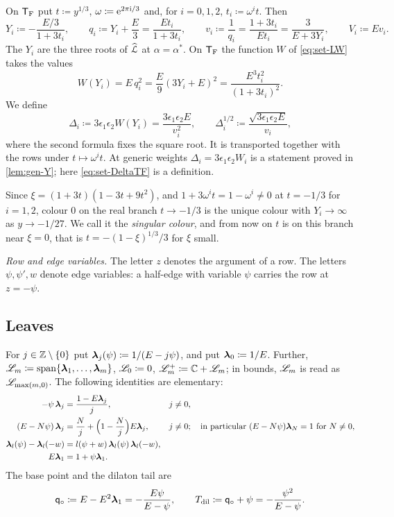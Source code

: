 On $\mathsf{T}_{\mathrm{F}}$ put $t\coloneqq y^{1/3}$, $\omega\coloneqq\mathrm{e}^{2\pi\mathrm{i}/3}$ and, for $i=0,1,2$, $t_i\coloneqq\omega^it$. Then
\begin{equation}
\label{eq:set-colours}
Y_i\coloneqq-\frac{E/3}{1+3t_i},\qquad
q_i\coloneqq Y_i+\frac E3=\frac{Et_i}{1+3t_i},\qquad
v_i\coloneqq\frac{1}{q_i}=\frac{1+3t_i}{Et_i}=\frac{3}{E+3Y_i},\qquad
V_i\coloneqq Ev_i .
\end{equation}
The $Y_i$ are the three roots of $\widehat{\mathcal{L}}$ at $\alpha=\alpha^*$. On $\mathsf{T}_{\mathrm{F}}$ the function $W$ of \eqref{eq:set-LW} takes the values
\begin{equation}
\label{eq:set-WTF}
W(Y_i)=E\,q_i^2=\frac E9(3Y_i+E)^2=\frac{E^3t_i^2}{(1+3t_i)^2}.
\end{equation}
We define
\begin{equation}
\label{eq:set-DeltaTF}
\Delta_i\coloneqq3\epsilon_1\epsilon_2W(Y_i)=\frac{3\epsilon_1\epsilon_2E}{v_i^2},\qquad
\Delta_i^{1/2}\coloneqq\frac{\sqrt{3\epsilon_1\epsilon_2E}}{v_i},
\end{equation}
where the second formula fixes the square root. It is transported together with the rows under $t\mapsto\omega^it$. At generic weights $\Delta_i=3\epsilon_1\epsilon_2W_i$ is a statement proved in \cref{lem:gen-Y}; here \eqref{eq:set-DeltaTF} is a definition.

Since $\xi=(1+3t)(1-3t+9t^2)$, and $1+3\omega^it=1-\omega^i\neq0$ at $t=-1/3$ for $i=1,2$, colour $0$ on the real branch $t\to-1/3$ is the unique colour with $Y_i\to\infty$ as $y\to-1/27$. We call it the \emph{singular colour}, and from now on $t$ is on this branch near $\xi=0$, that is $t=-(1-\xi)^{1/3}/3$ for $\xi$ small.

\emph{Row and edge variables.} The letter $z$ denotes the argument of a row. The letters $\psi,\psi',w$ denote edge variables: a half-edge with variable $\psi$ carries the row at $z=-\psi$.

\subsection{Leaves}
\label{sec:set-leaves}

For $j\in\mathbb{Z}\setminus\{0\}$ put $\boldsymbol{\lambda}_j(\psi)\coloneqq1/(E-j\psi)$, and put $\boldsymbol{\lambda}_0\coloneqq1/E$. Further, $\mathscr{L}_m\coloneqq\mathrm{span}\{\boldsymbol{\lambda}_1,\ldots,\boldsymbol{\lambda}_m\}$, $\mathscr{L}_0\coloneqq0$, $\mathscr{L}_m^{+}\coloneqq\mathbb{C}+\mathscr{L}_m$; in bounds, $\mathscr{L}_m$ is read as $\mathscr{L}_{\max(m,0)}$. The following identities are elementary:
\begin{align}
-\psi\,\boldsymbol{\lambda}_j&=\frac{1-E\boldsymbol{\lambda}_j}{j}, && j\neq0, \label{eq:set-lam1}\\
(E-N\psi)\,\boldsymbol{\lambda}_j&=\frac Nj+\Big(1-\frac Nj\Big)E\boldsymbol{\lambda}_j, && j\neq0;\quad\text{in particular } (E-N\psi)\boldsymbol{\lambda}_N=1 \text{ for } N\neq0, \label{eq:set-lam2}\\
\boldsymbol{\lambda}_l(\psi)-\boldsymbol{\lambda}_l(-w)&=l(\psi+w)\,\boldsymbol{\lambda}_l(\psi)\,\boldsymbol{\lambda}_l(-w), \label{eq:set-lam3}\\
E\boldsymbol{\lambda}_1&=1+\psi\boldsymbol{\lambda}_1. \label{eq:set-lam4}
\end{align}
The base point and the dilaton tail are
\[
\mathsf{q}_{\circ}\coloneqq E-E^2\boldsymbol{\lambda}_1=-\frac{E\psi}{E-\psi},\qquad T_{\mathrm{dil}}\coloneqq\mathsf{q}_{\circ}+\psi=-\frac{\psi^2}{E-\psi}.
\]

